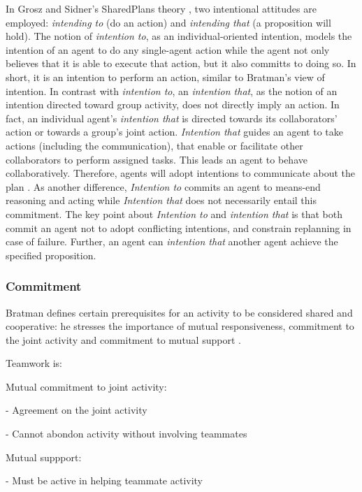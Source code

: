 \documentclass[11pt]{article}
\begin{document}
In Grosz and Sidner's SharedPlans theory \cite{grosz:plans-discourse}, two
intentional attitudes are employed: \textit{intending to} (do an action) and
\textit{intending that} (a proposition will hold). The notion of
\textit{intention to}, as an individual-oriented intention, models the intention
of an agent to do any single-agent action while the agent not only believes that
it is able to execute that action, but it also committs to doing so. In short,
it is an intention to perform an action, similar to Bratman's view of intention.
In contrast with \textit{intention to}, an \textit{intention that}, as the
notion of an intention directed toward group activity, does not directly imply
an action. In fact, an individual agent's \textit{intention that} is directed
towards its collaborators' action or towards a group's joint action.
\textit{Intention that} guides an agent to take actions (including the
communication), that enable or facilitate other collaborators to perform
assigned tasks. This leads an agent to behave collaboratively. Therefore, agents
will adopt intentions to communicate about the plan \cite{grosz:collaboration}.
As another difference, \textit{Intention to} commits an agent to means-end
reasoning and acting \cite{bratman:intentions-plans} while \textit{Intention
that} does not necessarily entail this commitment. The key point about
\textit{Intention to} and \textit{intention that} is that both commit an agent
not to adopt conflicting intentions, and constrain replanning in case of
failure. Further, an agent can \textit{intention that} another agent achieve the
specified proposition.

\subsubsection{Commitment}

Bratman defines certain prerequisites for an activity to be considered shared
and cooperative: he stresses the importance of mutual responsiveness, commitment
to the joint activity and commitment to mutual support
\cite{bratman:shared-activity}.

Teamwork is:

Mutual commitment to joint activity:

- Agreement on the joint activity

- Cannot abondon activity without involving teammates

Mutual suppport:

- Must be active in helping teammate activity
\end{document}

